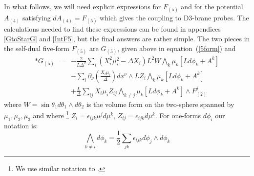 \documentclass[a4paper,12pt]{article}
\begin{document}
In what follows, we will need explicit expressions for $F_{(5)}$ and for the potential $A_{(4)}$ satisfying $dA_{(4)} = F_{(5)}$ which gives the coupling to D3-brane probes. The calculations needed to find these expressions can be found in appendices \ref{GtoStarG} and \ref{IntF5}, but the final answers are rather simple. The two pieces in the self-dual five-form $F_{(5)}$ are $G_{(5)}$, given above in equation~(\ref{5form}) and 
\begin{eqnarray}
*G_{(5)} &=& -\frac{2}{L \Delta^2}  \sum_i (X_i^{2}  \mu_i ^2 - \Delta X_i) L^2 W  \bigwedge_k \mu_k [L d \phi_k + A^k] \nonumber \\
   & &  - \sum_i \partial_{\nu} \left( \frac{X_i \mu_i}{\Delta} \right) dx^{\nu} \wedge L Z_i \bigwedge_k \mu_k [L d \phi_k + A^k] \nonumber \\
  & & + \frac{L}{\Delta} \sum_{i j} X_i \mu_i Z_{ij} \bigwedge_{k \neq j} \mu_k [L d \phi_k + A^k] \wedge F^j_{(2)}
\label{StarG5}
\end{eqnarray}
where $W =  \sin \theta_1 d\theta_1 \wedge d\theta_2$ is the volume form on the
two-sphere spanned by $\mu_1, \mu_2, \mu_3$ and where
\footnote{We use similar notation to \cite{Cvetic:2000eb}.}
$Z_i = \epsilon_{ijk} \mu^j d\mu^k$, $Z_{ij} = \epsilon_{ijk} d\mu^k$. For
one-forms $d\phi_i$ our notation is:
$$ \bigwedge_{k \neq i} d\phi_k = \frac{1}{2} \sum_{jk} \epsilon_{ijk} d\phi_j \wedge d\phi_k $$
\end{document}
